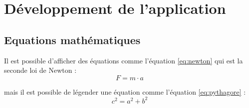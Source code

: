 \chapter{Développement de l'application}
\section{Equations mathématiques}
Il est possible d'afficher des équations comme l'équation \ref{eq:newton} qui est la seconde loi de Newton :
\begin{equation} \label{eq:newton}
    F = m \cdot a 
\end{equation}

mais il est possible de légender une équation comme l'équation \ref{eq:pythagore} : 
\begin{equation}\label{eq:pythagore}
   c^2 = a^2 + b^2
\end{equation}